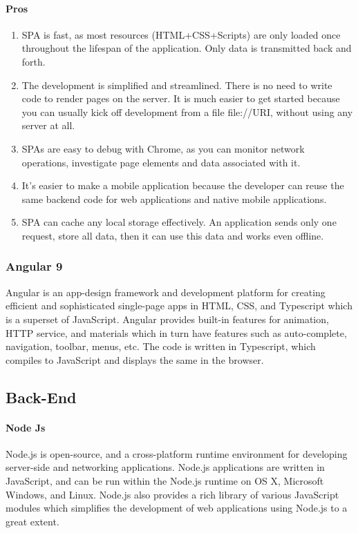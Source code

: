 \paragraph{Pros}
\begin{enumerate}
      \item 
      SPA is fast, as most resources (HTML+CSS+Scripts) are only loaded once throughout the lifespan of the application. Only data is transmitted back and forth.
      \item 
      The development is simplified and streamlined. There is no need to write code to render pages on the server. It is much easier to get started because you can usually kick off development from a file file://URI, without using any server at all.
      \item 
      SPAs are easy to debug with Chrome, as you can monitor network operations, investigate page elements and data associated with it.
      \item 
      It’s easier to make a mobile application because the developer can reuse the same backend code for web applications and native mobile applications.
      \item 
      SPA can cache any local storage effectively. An application sends only one request, store all data, then it can use this data and works even offline.
\end{enumerate}
\subsubsection{Angular 9}
Angular is an app-design framework and development platform for creating efficient and sophisticated single-page apps in \ac{HTML}, \ac{CSS}, and Typescript which is a superset of JavaScript. Angular provides built-in features for animation, \ac{HTTP} service, and materials which in turn have features such as auto-complete, navigation, toolbar, menus, etc. The code is written in Typescript, which compiles to JavaScript and displays the same in the browser.

\subsection{Back-End}
\paragraph{Node Js}
Node.js is open-source, and a cross-platform runtime environment for developing server-side and networking applications. Node.js applications are written in JavaScript, and can be run within the Node.js runtime on OS X, Microsoft Windows, and Linux.
Node.js also provides a rich library of various JavaScript modules which simplifies the development of web applications using Node.js to a great extent.

